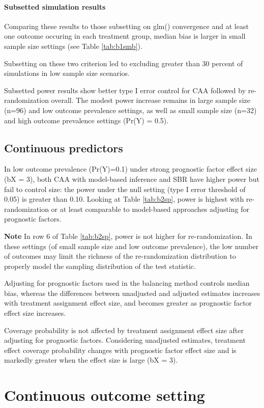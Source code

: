 \paragraph{Subsetted simulation results}
Comparing these results to those subsetting on glm() convergence and at least one outcome occuring in each treatment group,  median bias is larger in small sample size settings (see Table \ref{tab:b1smb}).

Subsetting on these two criterion led to excluding greater than 30 percent of simulations in low sample size scenarios.

Subsetted power results show better type I error control for CAA followed by re-randomization overall.
The modest power increase remains in large sample size (n=96) and low outcome prevalence settings, as well as small sample size (n=32) and high outcome prevalence settings (Pr(Y) = 0.5).


\subsection{Continuous predictors}
In low outcome prevalence (Pr(Y)=0.1) under strong prognostic factor effect size (bX = 3), both CAA with model-based inference and SBR have higher power but fail to control size: the power under the null setting (type I error threshold of 0.05) is greater than 0.10. 
Looking at Table \ref{tab:b2sp}, power is highest with re-randomization or at least comparable to model-based approaches adjusting for prognostic factors.

\textbf{Note} In row 6 of Table \ref{tab:b2sp}, power is not higher for re-randomization. In these settings (of small sample size and low outcome prevalence), the low number of outcomes may limit the richness of the re-randomization distribution to properly model the sampling distribution of the test statistic.

Adjusting for prognostic factors used in the balancing method controls median bias, whereas the differences between unadjusted and adjusted estimates increases with treatment assignment effect size, and becomes greater as prognostic factor effect size increases. 

Coverage probability is not affected by treatment assignment effect size after adjusting for prognostic factors.
Considering unadjusted estimates, treatment effect coverage probability changes with prognostic factor effect size and is markedly greater when the effect size is large (bX = 3).

\section{Continuous outcome setting}
